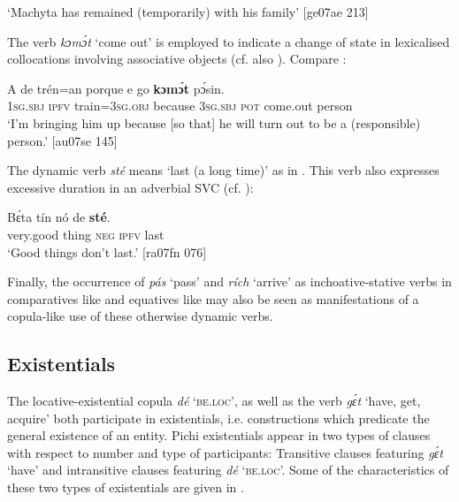 \glt ‘Machyta has remained (temporarily) with his family’ [ge07ae 213] 
\z

The verb \textit{kɔmɔ́t} ‘come out’ is employed to indicate a change of state in lexicalised collocations involving associative objects (cf. also ). Compare :


\ea%
    \label{ex:key:802}
    \gll \MakeUppercase{A}   de  trén=an    porque  e    go  \textbf{kɔmɔ́t}    pɔ́sin.\\
\textsc{1sg.sbj}  \textsc{ipfv}  train=\textsc{3sg.obj}  because  \textsc{3sg.sbj}  \textsc{pot}  come.out  person\\

\glt ‘I’m bringing him up because [so that] he will turn out to be a (responsible) 
person.’ [au07se 145]
\z

The dynamic verb \textit{sté} means ‘last (a long time)’ as in . This verb also expresses excessive duration in an adverbial SVC (cf. ):


\ea%
    \label{ex:key:803}
    \gll Bɛ́ta      tín    nó  de  \textbf{sté}.\\
very.good  thing  \textsc{neg}  \textsc{ipfv}  last\\

\glt ‘Good things don’t last.’ [ra07fn 076]
\z

Finally, the occurrence of \textit{pás} ‘pass’ and \textit{rích} ‘arrive’ as inchoative-stative verbs in comparatives like  and equatives like  may also be seen as manifestations of a copula-like use of these otherwise dynamic verbs. 

\subsection{Existentials}\label{sec:7.6.3}

The locative-existential copula{\fff} \textit{dé} ‘\textsc{be.loc}’, as well as the verb \textit{gɛ́t} ‘have, get, acquire’ both participate in existentials, i.e. constructions which predicate the general existence of an entity. Pichi existentials appear in two types of clauses with respect to number and type of participants: Transitive clauses featuring \textit{gɛ́t} ‘have’ and intransitive clauses featuring \textit{dé} ‘\textsc{be.loc}’. Some of the characteristics of these two types of existentials are given in .

